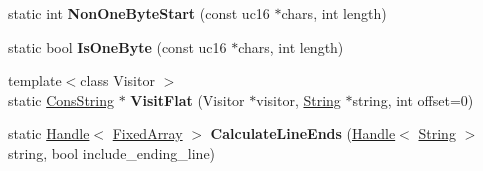 \begin{DoxyCompactItemize}
\item 
\hypertarget{classv8_1_1internal_1_1_string_a803ee7a24653b9b58b659b346e063b52}{}static int {\bfseries Non\+One\+Byte\+Start} (const uc16 $\ast$chars, int length)\label{classv8_1_1internal_1_1_string_a803ee7a24653b9b58b659b346e063b52}

\item 
\hypertarget{classv8_1_1internal_1_1_string_af81bc4a43e12f2bf5f76f8ca482052d7}{}static bool {\bfseries Is\+One\+Byte} (const uc16 $\ast$chars, int length)\label{classv8_1_1internal_1_1_string_af81bc4a43e12f2bf5f76f8ca482052d7}

\item 
\hypertarget{classv8_1_1internal_1_1_string_a9b944f06fee81942a8030aa635ed1cd4}{}{\footnotesize template$<$class Visitor $>$ }\\static \hyperlink{classv8_1_1internal_1_1_cons_string}{Cons\+String} $\ast$ {\bfseries Visit\+Flat} (Visitor $\ast$visitor, \hyperlink{classv8_1_1internal_1_1_string}{String} $\ast$string, int offset=0)\label{classv8_1_1internal_1_1_string_a9b944f06fee81942a8030aa635ed1cd4}

\item 
\hypertarget{classv8_1_1internal_1_1_string_ac2486293ec2b4544ed1d30dfefbc3956}{}static \hyperlink{classv8_1_1internal_1_1_handle}{Handle}$<$ \hyperlink{classv8_1_1internal_1_1_fixed_array}{Fixed\+Array} $>$ {\bfseries Calculate\+Line\+Ends} (\hyperlink{classv8_1_1internal_1_1_handle}{Handle}$<$ \hyperlink{classv8_1_1internal_1_1_string}{String} $>$ string, bool include\+\_\+ending\+\_\+line)\label{classv8_1_1internal_1_1_string_ac2486293ec2b4544ed1d30dfefbc3956}

\end{DoxyCompactItemize}
